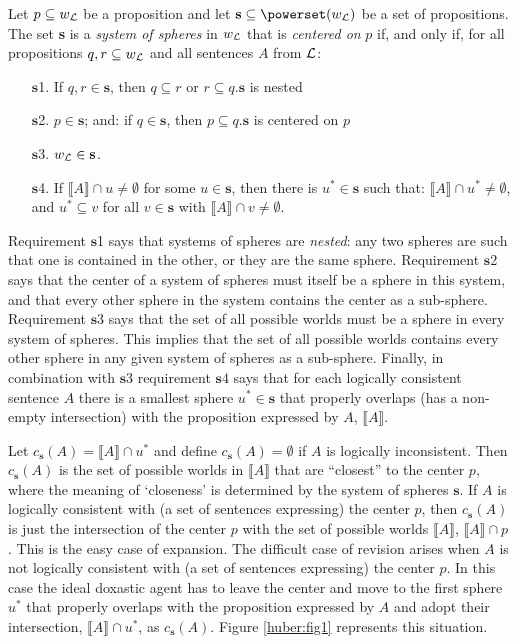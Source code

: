 Let $p\subseteq w_{\cal L}$ be a proposition and let $\textbf{s}\subseteq\powerset\!\left(w_{\cal L}\right)$ be a set of propositions. The set \textbf{s} is a \emph{system of spheres} in $w_{\cal L}$ that is \emph{centered on} $p$ if, and only if, for all propositions $q,r\subseteq w_{\cal L}$ and all sentences $A$ from $\cal L$:
\begin{enumerate}
\item[$\textbf{s}$1.] If $q,r\in\textbf{s}$, then $q\subseteq r$ or $r\subseteq q$.\hfill $\textbf{s}$ is nested
\item[$\textbf{s}$2.] $p\in\textbf{s}$; and: if $q\in\textbf{s}$, then $p\subseteq q$.\hfill $\textbf{s}$ is centered on $p$
\item[$\textbf{s}$3.] $w_{\cal L}\in\textbf{s}$.
\item[$\textbf{s}$4.] If $\llbracket A\rrbracket\cap u\neq\emptyset$ for some $u\in\textbf{s}$, then there is $u^*\in\textbf{s}$ such that: $\llbracket A\rrbracket\cap u^*\neq\emptyset$, and $u^*\subseteq v$ for all $v\in\textbf{s}$ with $\llbracket A\rrbracket\cap v\neq\emptyset$.
\end{enumerate}
Requirement $\textbf{s}$1 says that systems of spheres are \emph{nested}: any two spheres are such that one is contained in the other, or they are the same sphere. Requirement $\textbf{s}$2
says that the center of a system of spheres must itself be a sphere in this system, and that every other sphere in the system contains the center as a sub-sphere. Requirement $\textbf{s}$3 says that the set of all possible worlds must be a sphere in every system of spheres. This implies that the set of all possible worlds contains every other sphere in any given system of spheres as a sub-sphere. Finally, in combination with $\textbf{s}3$ requirement $\textbf{s}4$ says that for each logically consistent sentence $A$ there is a smallest sphere $u^*\in\textbf{s}$ that properly overlaps (has a non-empty intersection) with the proposition expressed by $A$, $\llbracket A\rrbracket$.

Let $c_{\textbf{s}}\left(A\right)=\llbracket A\rrbracket\cap u^*$ and define $c_{\textbf{s}}\left(A\right)=\emptyset$ if $A$ is logically inconsistent. Then $c_{\textbf{s}}\left(A\right)$ is the set of possible worlds in $\llbracket A\rrbracket$ that are ``closest'' to the center $p$, where the meaning of `closeness' is determined by the system of spheres $\textbf{s}$. If $A$ is logically consistent with (a set of sentences expressing) the center $p$, then $c_{\textbf{s}}\left(A\right)$ is just the intersection of the center $p$ with the set of possible worlds $\llbracket A\rrbracket$, $\llbracket A\rrbracket\cap p$. This is the easy case of expansion. The difficult case of revision arises when $A$ is not logically consistent with (a set of sentences expressing) the center $p$. In this case the ideal doxastic agent has to leave the center and move to the first sphere $u^*$ that properly overlaps with the proposition expressed by $A$ and adopt their intersection, $\llbracket A\rrbracket\cap u^*$, as $c_{\textbf{s}}\left(A\right)$. Figure \ref{huber:fig1} represents this situation.

